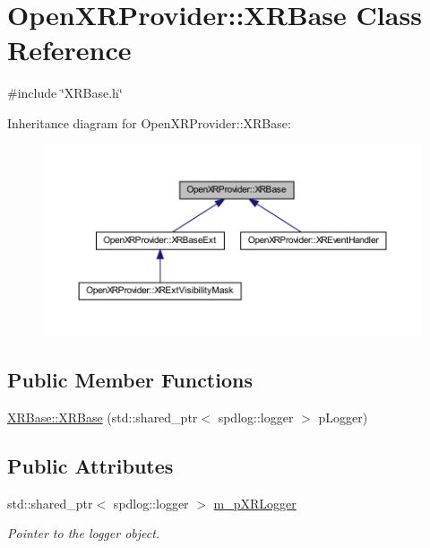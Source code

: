 \hypertarget{class_open_x_r_provider_1_1_x_r_base}{}\section{Open\+X\+R\+Provider\+::X\+R\+Base Class Reference}
\label{class_open_x_r_provider_1_1_x_r_base}


{\ttfamily \#include \char`\"{}X\+R\+Base.\+h\char`\"{}}



Inheritance diagram for Open\+X\+R\+Provider\+::X\+R\+Base\+:\nopagebreak
\begin{figure}[H]
\begin{center}
\leavevmode
\includegraphics[width=350pt]{class_open_x_r_provider_1_1_x_r_base__inherit__graph}
\end{center}
\end{figure}
\subsection*{Public Member Functions}
\begin{DoxyCompactItemize}
\item 
\mbox{\hyperlink{class_open_x_r_provider_1_1_x_r_base_a10b7af39f9c344f6c932d1d0f6364af9}{X\+R\+Base\+::\+X\+R\+Base}} (std\+::shared\+\_\+ptr$<$ spdlog\+::logger $>$ p\+Logger)
\end{DoxyCompactItemize}
\subsection*{Public Attributes}
\begin{DoxyCompactItemize}
\item 
std\+::shared\+\_\+ptr$<$ spdlog\+::logger $>$ \mbox{\hyperlink{class_open_x_r_provider_1_1_x_r_base_ad8f2954d8fa4724f1d41076efe392c97}{m\+\_\+p\+X\+R\+Logger}}
\begin{DoxyCompactList}\small\item\em Pointer to the logger object. \end{DoxyCompactList}\end{DoxyCompactItemize}


